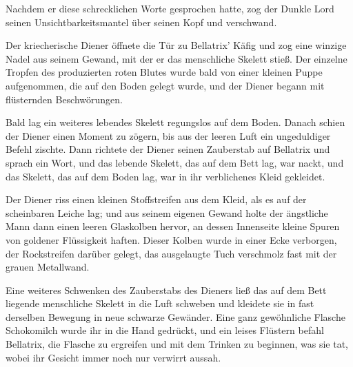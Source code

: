 Nachdem er diese schrecklichen Worte gesprochen hatte, zog der Dunkle Lord seinen Unsichtbarkeitsmantel über seinen Kopf und verschwand.

Der kriecherische Diener öffnete die Tür zu Bellatrix' Käfig und zog eine winzige Nadel aus seinem Gewand, mit der er das menschliche Skelett stieß. Der einzelne Tropfen des produzierten roten Blutes wurde bald von einer kleinen Puppe aufgenommen, die auf den Boden gelegt wurde, und der Diener begann mit flüsternden Beschwörungen.

Bald lag ein weiteres lebendes Skelett regungslos auf dem Boden. Danach schien der Diener einen Moment zu zögern, bis aus der leeren Luft ein ungeduldiger Befehl zischte. Dann richtete der Diener seinen Zauberstab auf Bellatrix und sprach ein Wort, und das lebende Skelett, das auf dem Bett lag, war nackt, und das Skelett, das auf dem Boden lag, war in ihr verblichenes Kleid gekleidet.

Der Diener riss einen kleinen Stoffstreifen aus dem Kleid, als es auf der scheinbaren Leiche lag; und aus seinem eigenen Gewand holte der ängstliche Mann dann einen leeren Glaskolben hervor, an dessen Innenseite kleine Spuren von goldener Flüssigkeit haften. Dieser Kolben wurde in einer Ecke verborgen, der Rockstreifen darüber gelegt, das ausgelaugte Tuch verschmolz fast mit der grauen Metallwand.

Eine weiteres Schwenken des Zauberstabs des Dieners ließ das auf dem Bett liegende menschliche Skelett in die Luft schweben und kleidete sie in fast derselben Bewegung in neue schwarze Gewänder. Eine ganz gewöhnliche Flasche Schokomilch wurde ihr in die Hand gedrückt, und ein leises Flüstern befahl Bellatrix, die Flasche zu ergreifen und mit dem Trinken zu beginnen, was sie tat, wobei ihr Gesicht immer noch nur verwirrt aussah.

